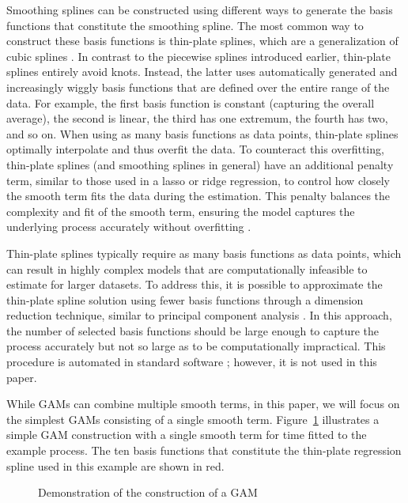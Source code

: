 \documentclass[man, floatsintext]{apa7}
\begin{document}
Smoothing splines can be constructed using different ways to generate the basis
functions that constitute the smoothing spline. The most common way to
construct these basis functions is thin-plate splines, which are a
generalization of cubic splines \parencite{wood_generalized_2006}. In contrast
to the piecewise splines introduced earlier, thin-plate splines entirely avoid
knots. Instead, the latter uses automatically generated and increasingly wiggly
basis functions  that are defined over the entire range of the data. For
example, the first basis function is constant (capturing the overall average),
the second is linear, the third has one extremum, the fourth has two, and so
on. When using as many basis functions as data points, thin-plate splines
optimally interpolate and thus overfit the data. To counteract this
overfitting, thin-plate splines (and smoothing splines in general) have an
additional penalty term, similar to those used in a lasso or ridge regression,
to control how closely the smooth term fits the data during the estimation.
This penalty balances the complexity and fit of the smooth term, ensuring the
model captures the underlying process accurately without overfitting
\parencite{gu_smoothing_2013, wahba_spline_1980}.

Thin-plate splines typically require as many basis functions as data points,
which can result in highly complex models that are computationally infeasible
to estimate for larger datasets. To address this, it is possible to approximate
the thin-plate spline solution using fewer basis functions through a dimension
reduction technique, similar to principal component analysis
\parencite{wood_thin_2003}. In this approach, the number of selected basis
functions should be large enough to capture the process accurately but not so
large as to be computationally impractical. This procedure is automated in
standard software \parencite{R-mgcv_a}; however, it is not used in this paper.

While GAMs can combine multiple smooth terms, in this paper, we will focus on
the simplest GAMs consisting of a single smooth term. Figure~\ref{fig:gam_dem}
illustrates a simple GAM construction with a single smooth term for time
fitted to the example process. The ten basis functions that constitute the
thin-plate regression spline used in this example are shown in red.

\begin{figure}[!t]
  \caption{Demonstration of the construction of a GAM}
  \label{fig:gam_dem}
\end{figure}
\end{document}
